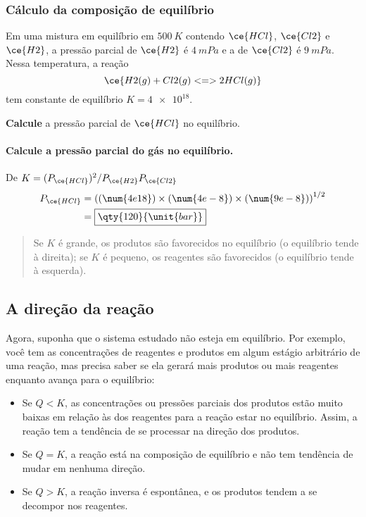 \begin{example}

\subsubsection{Cálculo da composição de equilíbrio}

Em uma mistura em equilíbrio em \(\qty{500}{\unit{K}}\) contendo \(\ce{HCl}\), \(\ce{Cl2}\) e \(\ce{H2}\), a pressão parcial de \(\ce{H2}\) é
\(\qty{4}{\unit{mPa}}\) e a de \(\ce{Cl2}\) é \(\qty{9}{\unit{mPa}}\). Nessa temperatura, a reação \[
    \ce{ H2(g) + Cl2(g) <=> 2 HCl(g) }
\] tem constante de equilíbrio \(K = \num{4e18}\).

\textbf{Calcule} a pressão parcial de \(\ce{HCl}\) no equilíbrio.

\paragraph{Calcule a pressão parcial do gás no equilíbrio.}

De \(K = (P_{\ce{HCl}})^2/P_{\ce{H2}}P_{\ce{Cl2}}\) \[
\begin{aligned}
    P_{\ce{HCl}} 
        &= \left( (\num{4e18}) \times (\num{4e-8}) \times (\num{9e-8}) \right)^{1/2} \\
        &= \boxed{ \qty{120}{\unit{bar}} }
\end{aligned}
\]

\end{example}

\begin{quote}
Se \(K\) é grande, os produtos são favorecidos no equilíbrio (o equilíbrio tende à direita); se \(K\) é pequeno, os reagentes são favorecidos (o
equilíbrio tende à esquerda).
\end{quote}

\subsection{A direção da reação}

Agora, suponha que o sistema estudado não esteja em equilíbrio. Por exemplo, você tem as concentrações de reagentes e produtos em algum estágio
arbitrário de uma reação, mas precisa saber se ela gerará mais produtos ou mais reagentes enquanto avança para o equilíbrio:

\begin{itemize}
\tightlist
\item
  Se \(Q < K\), as concentrações ou pressões parciais dos produtos estão muito baixas em relação às dos reagentes para a reação estar no equilíbrio.
  Assim, a reação tem a tendência de se processar na direção dos produtos.
\item
  Se \(Q = K\), a reação está na composição de equilíbrio e não tem tendência de mudar em nenhuma direção.
\item
  Se \(Q > K\), a reação inversa é espontânea, e os produtos tendem a se decompor nos reagentes.
\end{itemize}

